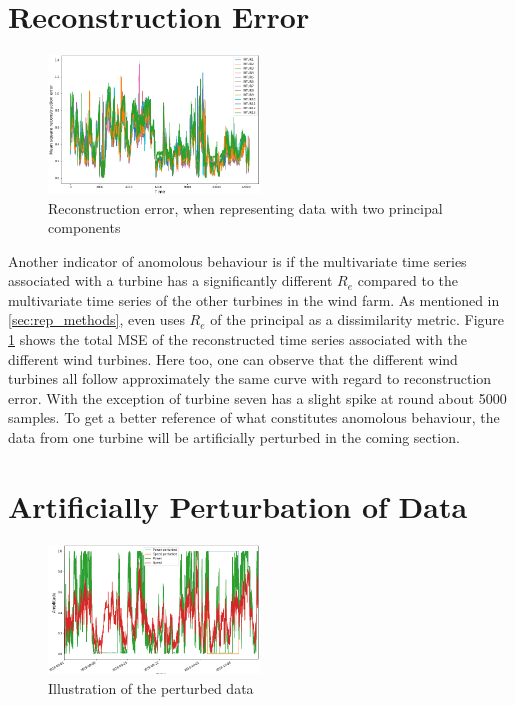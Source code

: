 \section{Reconstruction Error}

\begin{figure}[h]
    \begin{center}
    \includegraphics[width=0.5\textwidth]{data_exp/reconstruction_error}
    \end{center}
    \caption{Reconstruction error, when representing data with two principal components} 
    \label{fig:recon_error}
\end{figure}

Another indicator of anomolous behaviour is if the multivariate time series associated with a turbine has a significantly different $R_e$ compared to the multivariate time series of the other turbines in the wind farm. 
As mentioned in \ref{sec:rep_methods}, \textcite{multivariate_tsc_common_pca} even uses $R_e$ of the principal as a dissimilarity metric.
Figure \ref{fig:recon_error} shows the total MSE of the reconstructed time series associated with the different wind turbines. 
Here too, one can observe that the different wind turbines all follow approximately the same curve with regard to reconstruction error. 
With the exception of turbine seven has a slight spike at round about 5000 samples. 
To get a better reference of what constitutes anomolous behaviour, the data from one turbine will be artificially perturbed in the coming section. 

\section{Artificially Perturbation of Data}

\begin{figure}
    \begin{center}
    \includegraphics[width=0.5\textwidth]{data_exp/perturbed_vs_unperturbed}
    \end{center}
    \caption{Illustration of the perturbed data} 
    \label{fig:illu_perturbed_data}
\end{figure}

